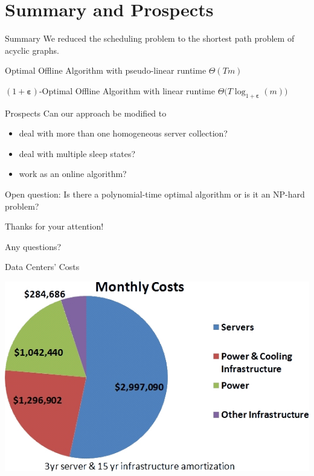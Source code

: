 \documentclass{beamer}
\newcommand{\beps}{\boldsymbol\varepsilon}
\begin{document}
\section{Summary and Prospects}
\begin{frame}{Summary}
We reduced the scheduling problem to the shortest path problem of acyclic graphs.

\pause
\begin{alertbox}
\centering Optimal Offline Algorithm with pseudo-linear runtime $\Theta(Tm)$
\end{alertbox}
\pause
\begin{alertbox}
\centering $(1+\beps)$-Optimal Offline Algorithm with linear runtime $\Theta\bigl(T\log_{1+\beps}(m)\bigr)$
\end{alertbox}
\end{frame}
\begin{frame}{Prospects}
Can our approach be modified to\dotso
\pause
\begin{itemize}[<+->]
	\item deal with more than one homogeneous server collection?
	\item deal with multiple sleep states?
	\item work as an online algorithm?
\end{itemize}
\pause[\thebeamerpauses]
Open question: Is there a polynomial-time optimal algorithm or is it an NP-hard problem?
\end{frame}
\begin{frame}[standout]
Thanks for your attention!

Any questions?
\end{frame}
\begin{frame}{Data Centers' Costs}

\vspace{0.5\baselineskip}
\centering\includegraphics[height=0.5\textheight]{img/data_center_costs.jpg}
\end{frame}
\end{document}
